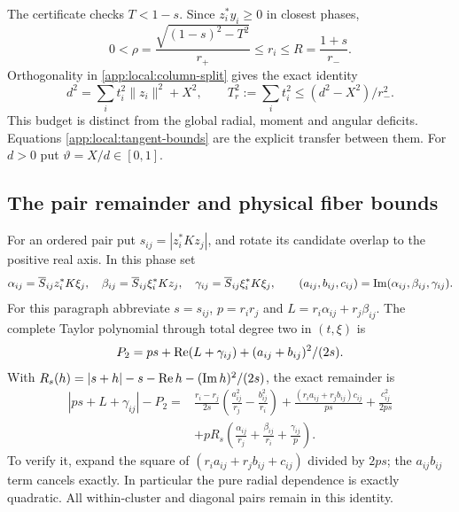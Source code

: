 The certificate checks $T<1-s$. Since $z_i^*y_i\ge0$ in closest phases,
\begin{equation}\label{app:local:radial-interval}
 0<\rho=\frac{\sqrt{(1-s)^2-T^2}}{r_+}\le r_i
 \le R=\frac{1+s}{r_-}.
\end{equation}
Orthogonality in \eqref{app:local:column-split} gives the exact identity
\begin{equation}\label{app:local:shared-budget}
 d^2=\sum_i t_i^2\|z_i\|^2+X^2,\qquad
 T_r^2:=\sum_i t_i^2\le(d^2-X^2)/r_-^2.
\end{equation}
This budget is distinct from the global radial, moment and angular
deficits. Equations \eqref{app:local:tangent-bounds} are the explicit
transfer between them. For $d>0$ put $\vartheta=X/d\in[0,1]$.

\subsection{The pair remainder and physical fiber bounds}
\label{app:local:pair-remainder}

For an ordered pair put $s_{ij}=|z_i^*Kz_j|$, and rotate its candidate
overlap to the positive real axis. In this phase set
\[
 \alpha_{ij}=\overline S_{ij}z_i^*K\xi_j,\quad
 \beta_{ij}=\overline S_{ij}\xi_i^*Kz_j,\quad
 \gamma_{ij}=\overline S_{ij}\xi_i^*K\xi_j,
 \qquad (a_{ij},b_{ij},c_{ij})=\operatorname{Im}(\alpha_{ij},\beta_{ij},\gamma_{ij}).
\]
For this paragraph abbreviate $s=s_{ij}$, $p=r_ir_j$ and
$L=r_i\alpha_{ij}+r_j\beta_{ij}$. The complete Taylor polynomial
through total degree two in $(t,\xi)$ is
\[
 P_2=ps+\operatorname{Re}(L+\gamma_{ij})+(a_{ij}+b_{ij})^2/(2s).
\]
With $R_s(h)=|s+h|-s-\operatorname{Re} h-(\operatorname{Im} h)^2/(2s)$, the exact remainder is
\begin{align}
 |ps+L+\gamma_{ij}|-P_2={}&
 \frac{r_i-r_j}{2s}\left(\frac{a_{ij}^2}{r_j}-\frac{b_{ij}^2}{r_i}\right)
 +\frac{(r_i a_{ij}+r_j b_{ij})c_{ij}}{ps}
 +\frac{c_{ij}^2}{2ps}\nonumber\\
 &+pR_s\left(\frac{\alpha_{ij}}{r_j}+
              \frac{\beta_{ij}}{r_i}+\frac{\gamma_{ij}}p\right).
 \label{app:local:exact-pair}
\end{align}
To verify it, expand the square of
$(r_i a_{ij}+r_j b_{ij}+c_{ij})$ divided by $2ps$;
the $a_{ij}b_{ij}$ term cancels exactly. In particular the pure radial
dependence is exactly quadratic. All within-cluster and diagonal pairs
remain in this identity.

